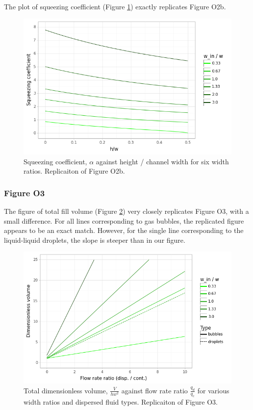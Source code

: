 The plot of squeezing coefficient (Figure \ref{fig2b}) exactly replicates Figure O2b.

\begin{figure}[ht]
  \centering
  \includegraphics[width=0.8\linewidth]{../figures/fig_2b.png}
  \caption{Squeezing coefficient, $\alpha$ against height / channel width
  for six width ratios. Replicaiton of Figure O2b.}
  \label{fig2b}
\end{figure}

\subsubsection{Figure O3}

The figure of total fill volume (Figure \ref{fig3}) very closely replicates Figure O3, with a small
difference. For all lines corresponding to gas bubbles, the replicated figure appears to be
an exact match. However, for the single line corresponding to the liquid-liquid droplets, the
slope is steeper than in our figure.

\begin{figure}[ht]
  \centering
  \includegraphics[width=0.8\linewidth]{../figures/fig_3.png}
  \caption{Total dimensionless volume, $\frac{V}{hw^2}$ against flow rate ratio $\frac{q_d}{q_c}$
  for various width ratios and dispersed fluid types. Replicaiton of Figure O3.}
  \label{fig3}
\end{figure}

